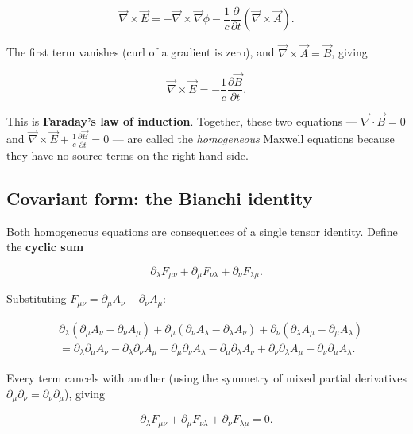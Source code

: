 \begin{equation}
\vec{\nabla}\times\vec{E} = -\vec{\nabla}\times\vec{\nabla}\phi - \frac{1}{c}\frac{\partial}{\partial t}(\vec{\nabla}\times\vec{A}).
\end{equation}

The first term vanishes (curl of a gradient is zero), and $\vec{\nabla}\times\vec{A} = \vec{B}$, giving

\begin{equation}
\vec{\nabla}\times\vec{E} = -\frac{1}{c}\frac{\partial\vec{B}}{\partial t}.
\end{equation}

This is \textbf{Faraday's law of induction}. Together, these two equations --- $\vec{\nabla}\cdot\vec{B} = 0$ and $\vec{\nabla}\times\vec{E} + \frac{1}{c}\frac{\partial\vec{B}}{\partial t} = 0$ --- are called the \emph{homogeneous} Maxwell equations because they have no source terms on the right-hand side.

\subsection{Covariant form: the Bianchi identity}

Both homogeneous equations are consequences of a single tensor identity. Define the \textbf{cyclic sum}

\begin{equation}
\partial_\lambda F_{\mu\nu} + \partial_\mu F_{\nu\lambda} + \partial_\nu F_{\lambda\mu}.
\end{equation}

Substituting $F_{\mu\nu} = \partial_\mu A_\nu - \partial_\nu A_\mu$:

\begin{align}
&\partial_\lambda(\partial_\mu A_\nu - \partial_\nu A_\mu) + \partial_\mu(\partial_\nu A_\lambda - \partial_\lambda A_\nu) + \partial_\nu(\partial_\lambda A_\mu - \partial_\mu A_\lambda) \nonumber\\
&= \partial_\lambda\partial_\mu A_\nu - \partial_\lambda\partial_\nu A_\mu + \partial_\mu\partial_\nu A_\lambda - \partial_\mu\partial_\lambda A_\nu + \partial_\nu\partial_\lambda A_\mu - \partial_\nu\partial_\mu A_\lambda.
\end{align}

Every term cancels with another (using the symmetry of mixed partial derivatives $\partial_\mu\partial_\nu = \partial_\nu\partial_\mu$), giving

\begin{equation}
\boxed{\partial_\lambda F_{\mu\nu} + \partial_\mu F_{\nu\lambda} + \partial_\nu F_{\lambda\mu} = 0.}
\end{equation}

